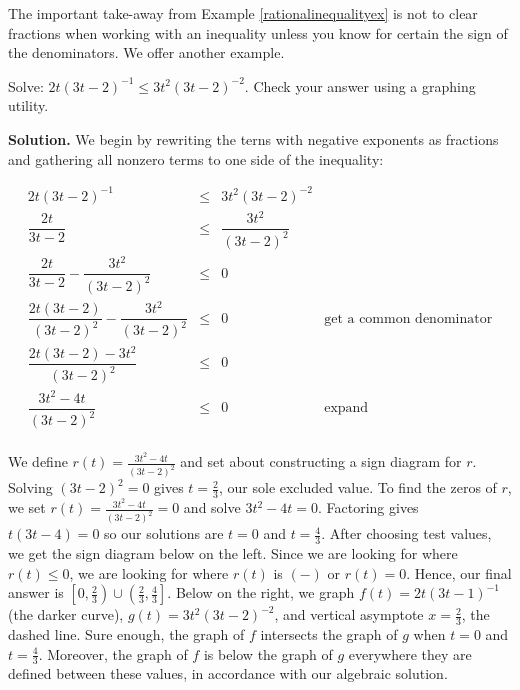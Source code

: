 \documentclass{ximera}
\begin{document}
The important take-away from Example \ref{rationalinequalityex} is not to clear fractions when working with an inequality unless you know for certain the sign of the denominators. We offer another example.

\begin{example} \label{morerationalineq} Solve:  $2t (3t-2)^{-1} \leq 3t^2 (3t-2)^{-2}$. Check your answer using a graphing utility.


{\bf Solution.} We begin by rewriting the terns with negative exponents as fractions and gathering all nonzero terms to one side of the inequality:

\[ \begin{array}{rclr}

2t (3t-2)^{-1} &  \leq & 3t^2 (3t-2)^{-2} & \\ [10pt]

\dfrac{2t}{3t-2} & \leq & \dfrac{3t^2}{(3t-2)^2} & \\ [10pt]


\dfrac{2t}{3t-2}  - \dfrac{3t^2}{(3t-2)^2}  & \leq & 0 &  \\ [10pt]

\dfrac{2t(3t-2)}{(3t-2)^2}  - \dfrac{3t^2}{(3t-2)^2}  & \leq & 0  & \text{get a common denominator} \\ [10pt]

\dfrac{2t(3t-2) - 3t^2}{(3t-2)^2}  & \leq & 0  &\\ [10pt]

\dfrac{3t^2-4t}{(3t-2)^2}  & \leq & 0  & \text{expand} \\ [10pt]

\end{array} \]

We define $r(t) = \frac{3t^2-4t}{(3t-2)^2}$ and set about constructing a sign diagram for $r$.  Solving  $(3t-2)^2 = 0$ gives $t = \frac{2}{3}$, our sole excluded value.  To find the zeros of $r$, we set $r(t) = \frac{3t^2-4t}{(3t-2)^2} = 0$ and solve $3t^2-4t = 0$.  Factoring gives $t(3t-4) = 0$ so our solutions are $t = 0$ and $t = \frac{4}{3}$. After choosing test values, we  get the sign diagram below on the left.   Since we are looking for where $r(t) \leq 0$, we are looking for where $r(t)$ is $(-)$ or $r(t) = 0$. Hence,  our final answer is $\left[0, \frac{2}{3} \right) \cup \left(\frac{2}{3}, \frac{4}{3} \right]$.  Below on the right,  we graph $f(t) = 2t(3t-1)^{-1}$ (the darker curve),   $g(t) = 3t^2(3t-2)^{-2}$, and  vertical asymptote $x = \frac{2}{3}$, the dashed line.  Sure enough, the graph of $f$ intersects the graph of $g$ when $t = 0$ and $t = \frac{4}{3}$.  Moreover, the graph of $f$ is below the graph of $g$ everywhere they are defined between these values, in accordance with our algebraic solution.


\end{example}
\end{document}

